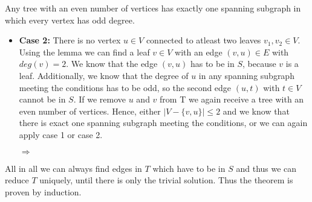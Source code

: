 \documentclass[a4paper]{article}
\begin{document}
\begin{solution}{6}
\begin{theorem}{Any tree with an even number of vertices has exactly one spanning subgraph in which every vertex has odd degree.}
\begin{itemize}
				
				\item \textbf{Case 2:} There is no vertex $u \in V$ connected to atleast two leaves $v_1, v_2 \in V$. \\
				Using the lemma we can find a leaf $v \in V$ with an edge $(v,u) \in E$ with $deg(v)=2$. 
				We know that the edge $(v,u)$ has to be in $S$, because $v$ is a leaf. 
				Additionally, we know that the degree of $u$ in any spanning subgraph meeting the conditions has to be odd, so the second edge $(u,t)$ with $t \in V$ cannot be in $S$. 
				If we remove $u$ and $v$ from T we again receive a tree with an even number of vertices. 
				Hence, either $|V- \{v,u\}| \leq 2$ and we know that there is exact one spanning subgraph meeting the conditions, or we can again apply case 1 or case 2. 
				\begin{center}
				 $\Rightarrow$
			\end{center}
			\end{itemize}
		All in all we can always find edges in $T$ which have to be in $S$ and thus we can reduce $T$ uniquely, until there is only the trivial solution. 
		Thus the theorem is proven by induction. 
		\end{theorem}
	\end{solution} 
	\newpage
\end{document}
